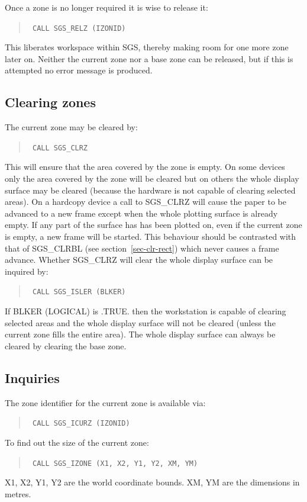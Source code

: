 \documentclass[11pt]{article}
\newcommand{\hyperref}[4]{#2\ref{#4}#3}
\newcommand{\htmlref}[2]{#1}
\begin{document}
Once a zone is no longer required it is wise to release it:
\begin{quote}{\tt
    CALL \htmlref{SGS\_RELZ}{SGS_RELZ} (IZONID)}
\end{quote}
This liberates workspace within SGS, thereby making
room for one more zone later on.  Neither the current zone nor a base zone
can be released, but if this is attempted no error message is produced.

\subsection {Clearing zones}

The current zone may be cleared by:
\begin{quote}{\tt
    CALL \htmlref{SGS\_CLRZ}{SGS_CLRZ}}
\end{quote}
This will ensure that the area covered by the zone is empty.  On some devices
only the area covered by the zone will be cleared but on others the whole
display surface may be cleared (because the hardware is 
not capable of clearing selected
areas).  On a hardcopy device a call to SGS\_CLRZ will cause the paper to 
be advanced to a new
frame except when the whole plotting surface is already empty.  If any part of
the surface has has been plotted on, even if the current zone is empty, a new
frame will be started.  This behaviour should be contrasted with 
that of \htmlref{SGS\_CLRBL}{SGS_CLRBL} (see 
\hyperref{this section}{section~}{}{sec-clr-rect}) which
never causes a frame advance.  Whether SGS\_CLRZ will clear the whole display
surface can be inquired by:
\begin{quote}{\tt
    CALL \htmlref{SGS\_ISLER}{SGS_ISLER} (BLKER)}
\end{quote}
If BLKER (LOGICAL) is .TRUE. then the workstation is capable of 
clearing selected areas and the whole display surface will not be cleared 
(unless the current zone fills
the entire area).  The whole display surface can always be cleared by 
clearing the base zone.

\subsection {Inquiries}

The zone identifier for the current zone is available via:
\begin{quote}{\tt
    CALL \htmlref{SGS\_ICURZ}{SGS_ICURZ} (IZONID)}
\end{quote}
To find out the size of the current zone:
\begin{quote}{\tt
    CALL \htmlref{SGS\_IZONE}{SGS_IZONE} (X1, X2, Y1, Y2, XM, YM)}
\end{quote}
X1, X2, Y1, Y2 are the world coordinate bounds.  XM, YM
are the dimensions in metres.
\end{document}
